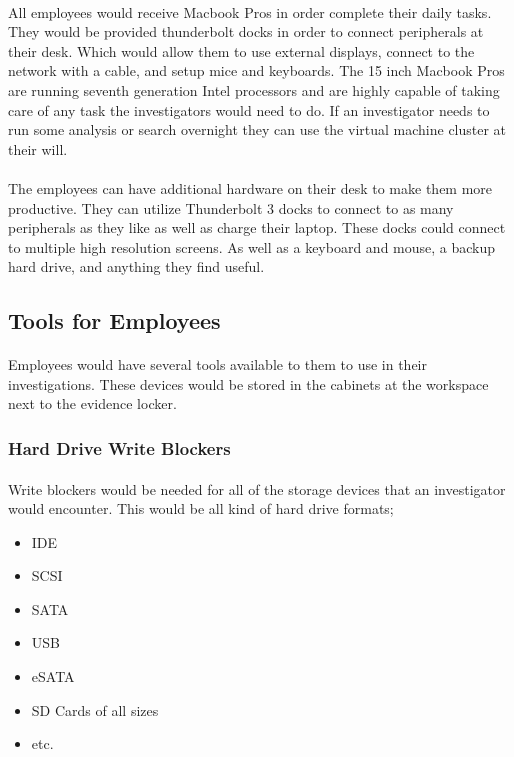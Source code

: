 \documentclass[12pt]{article}
\begin{document}
\paragraph{}
All employees would receive Macbook Pros in order complete their daily tasks.
They would be provided thunderbolt docks in order to connect peripherals at their desk.
Which would allow them to use external displays, connect to the network with a cable, and setup mice and keyboards.
The 15 inch Macbook Pros are running seventh generation Intel processors and are highly capable of taking care of any task the investigators would need to do. 
If an investigator needs to run some analysis or search overnight they can use the virtual machine cluster at their will.
\paragraph{}
The employees can have additional hardware on their desk to make them more productive.
They can utilize Thunderbolt 3 docks to connect to as many peripherals as they like as well as charge their laptop.
These docks could connect to multiple high resolution screens. As well as a keyboard and mouse, a backup hard drive, and anything they find useful.

 
\subsection{Tools for Employees} 
\paragraph{}
Employees would have several tools available to them to use in their investigations.
These devices would be stored in the cabinets at the workspace next to the evidence locker.
\subsubsection{Hard Drive Write Blockers}
\paragraph{}
Write blockers would be needed for all of the storage devices that an investigator would encounter.
This would be all kind of hard drive formats;
\begin{itemize}
\item IDE
\item SCSI
\item SATA
\item USB
\item eSATA
\item SD Cards of all sizes
\item etc.
\end{itemize}
\end{document}
